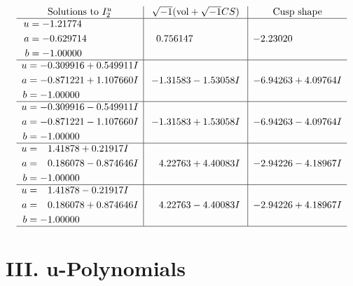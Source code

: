 \documentclass[1p]{elsarticle_modified}
\theoremstyle{definition}
\newcommand{\I}{\sqrt{-1}}
\begin{document}
$$\begin{array}{c|c|c}  
\text{Solutions to }I^u_{2}& \I (\text{vol} + \sqrt{-1}CS) & \text{Cusp shape}\\
 \hline 
\begin{aligned}
u &= -1.21774\phantom{ +0.000000I} \\
a &= -0.629714\phantom{ +0.000000I} \\
b &= -1.00000\phantom{ +0.000000I}\end{aligned}
 & \phantom{-}0.756147\phantom{ +0.000000I} & -2.23020\phantom{ +0.000000I} \\ \hline\begin{aligned}
u &= -0.309916 + 0.549911 I \\
a &= -0.871221 + 1.107660 I \\
b &= -1.00000\phantom{ +0.000000I}\end{aligned}
 & -1.31583 - 1.53058 I & -6.94263 + 4.09764 I \\ \hline\begin{aligned}
u &= -0.309916 - 0.549911 I \\
a &= -0.871221 - 1.107660 I \\
b &= -1.00000\phantom{ +0.000000I}\end{aligned}
 & -1.31583 + 1.53058 I & -6.94263 - 4.09764 I \\ \hline\begin{aligned}
u &= \phantom{-}1.41878 + 0.21917 I \\
a &= \phantom{-}0.186078 - 0.874646 I \\
b &= -1.00000\phantom{ +0.000000I}\end{aligned}
 & \phantom{-}4.22763 + 4.40083 I & -2.94226 - 4.18967 I \\ \hline\begin{aligned}
u &= \phantom{-}1.41878 - 0.21917 I \\
a &= \phantom{-}0.186078 + 0.874646 I \\
b &= -1.00000\phantom{ +0.000000I}\end{aligned}
 & \phantom{-}4.22763 - 4.40083 I & -2.94226 + 4.18967 I\\
 \hline 
 \end{array}$$\newpage
\newpage\renewcommand{\arraystretch}{1}
\centering \section*{ III. u-Polynomials}
\end{document}
